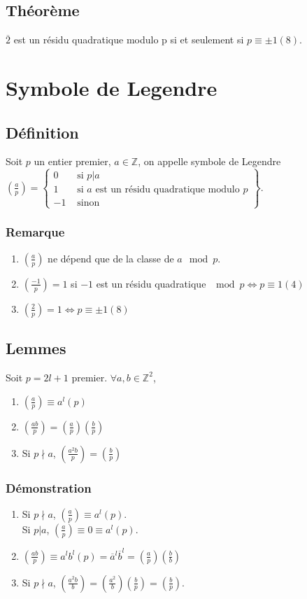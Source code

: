 \documentclass[a4paper,10pt]{book} %
\newcommand{\Z}{\mathbb{Z}}
\newcommand{\legendre}[2]{\left(\frac{#1}{#2}\right)}
\begin{document}
\subsection{Théorème}
$\overline{2}$ est un résidu quadratique modulo p si et seulement si $p\equiv \pm 1(8)$.

\section{Symbole de Legendre}
\subsection{Définition}
Soit $p$ un entier premier, $a\in \Z$, on appelle symbole de Legendre $\legendre{a}{p}=\left\{\begin{array}{rl}0&\text{ si }p|a \\ 1 &\text{ si } a\text{ est un résidu quadratique modulo }p\\ -1&\text{ sinon}\end{array}\right\}$.

\subsubsection{Remarque}
\begin{enumerate}
\item $\legendre{a}{p}$ ne dépend que de la classe de $a \mod p$.
\item $\legendre{-1}{p}=1$ si $-1$ est un résidu quadratique $\mod p \Leftrightarrow p\equiv 1(4)$
\item $\legendre{2}{p}=1 \Leftrightarrow p\equiv \pm 1(8)$
\end{enumerate}

\subsection{Lemmes}
Soit $p=2l+1$ premier. $\forall a,b\in \Z^2$,
\begin{enumerate}
\item $\legendre{a}{p}\equiv a^l(p)$
\item $\legendre{ab}{p}=\legendre{a}{p}\legendre{b}{p}$
\item Si $p\nmid a$, $\legendre{a^2b}{p}=\legendre{b}{p}$
\end{enumerate}

\subsubsection{Démonstration}
\begin{enumerate}
\item Si $p\nmid a$, $\legendre{a}{p}\equiv a^l(p)$.\\
Si $p|a$, $\legendre{a}{p}\equiv 0\equiv a^l(p)$.

\item $\legendre{ab}{p}\equiv a^lb^l(p)=\overline{a}^l\overline{b}^l=\legendre{a}{p}\legendre{b}{b}$

\item Si $p\nmid a$, $\legendre{a^2b}{b}=\legendre{a^2}{b}\legendre{b}{p}=\legendre{b}{p}$.
\end{enumerate}
\end{document}
